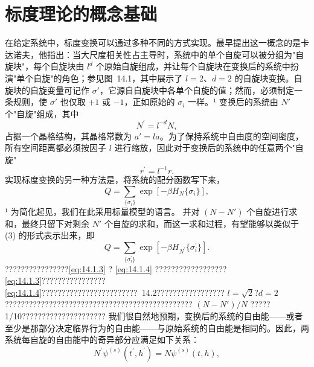 \section{标度理论的概念基础}\label{ux6807ux5ea6ux7406ux8bbaux7684ux6982ux5ff5ux57faux7840}
在给定系统中，标度变换可以通过多种不同的方式实现。最早提出这一概念的是卡达诺夫，他指出：当大尺度相关性占主导时，系统中的单个自旋可以被分组为"自旋块"，每个自旋块由 \(l^{d}\) 个原始自旋组成，并让每个自旋块在变换后的系统中扮演"单个自旋"的角色；参见图~14.1，其中展示了 \(l=2\)、\(d=2\) 的自旋块变换。自旋块的自旋变量可记作 \(\sigma'\)，它源自自旋块中各单个自旋的值；然而，必须制定一条规则，使 \(\sigma'\) 也仅取 \(+1\) 或 \(-1\)，正如原始的 \(\sigma_{i}\) 一样。¹ 变换后的系统由 \(N'\) 个"自旋"组成，其中
\begin{equation}\tag{14.1.1}\label{eq:14.1.1}
N ^{\prime} = l ^{- d} N ,
\end{equation}
占据一个晶格结构，其晶格常数为 \(a' = la\)。为了保持系统中自由度的空间密度，所有空间距离都必须按因子 \(l\) 进行缩放，因此对于变换后的系统中的任意两个"自旋"
\begin{equation}\tag{14.1.2}\label{eq:14.1.2}
r ^{\prime} = l ^{- 1} r .
\end{equation}
实现标度变换的另一种方法是，将系统的配分函数写下来，
\begin{equation}\tag{14.1.3}\label{eq:14.1.3}
Q = \sum _ { \{ \sigma _ { i } \} } \exp [ - \beta H _ { N } \{ \sigma _ { i } \} ] ,
\end{equation}
¹ 为简化起见，我们在此采用标量模型的语言。
并对 \((N-N')\) 个自旋进行求和，最终只留下对剩余 \(N'\) 个自旋的求和，而这一求和过程，有望能够以类似于 (3) 的形式表示出来，即
\begin{equation}\tag{14.1.4}\label{eq:14.1.4}
Q = \sum _ { \{ \sigma _ { i } ^{\prime} \} } \exp [ - \beta H _ { N ^{\prime} } \{ \sigma _ { i } ^{\prime} \} ] .
\end{equation}
????????????????\autoref{eq:14.1.3} ? \autoref{eq:14.1.4} ??????????????????\autoref{eq:14.1.3}????????????????\autoref{eq:14.1.4}????????????????????????~14.2????????????????? \(l=\sqrt{2}\)?\(d=2\)??????????????????????????????????????????????? \((N-N\prime)/N\) ????? 1/10?????????????????????
我们很自然地预期，变换后的系统的自由能——或者至少是那部分决定临界行为的自由能——与原始系统的自由能是相同的。因此，两系统每自旋的自由能中的奇异部分应满足如下关系：
\begin{equation}\tag{14.1.5}\label{eq:14.1.5}
N ^{\prime} \psi ^{( s )} ( t ^{\prime} , h ^{\prime} ) = N \psi ^{( s )} ( t , h ) ,
\end{equation}
